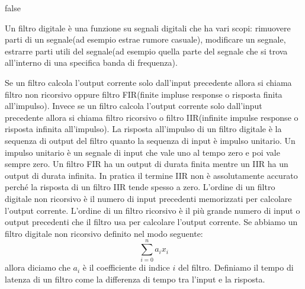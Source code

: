 
\if false

Un filtro digitale \`e una funzione su segnali digitali che ha vari scopi: rimuovere parti di un segnale(ad esempio estrae rumore casuale), modificare un segnale, estrarre parti utili del segnale(ad esempio quella parte del segnale che si trova all'interno di una specifica banda di frequenza). 


Se un filtro calcola l'output corrente solo dall'input precedente allora si chiama filtro non ricorsivo oppure filtro FIR(finite impluse response o risposta finita all'impulso). Invece se un filtro calcola l'output corrente solo dall'input precedente allora si chiama filtro ricorsivo o filtro IIR(infinite impulse response o risposta infinita all'impulso). 
La risposta all'impulso di un filtro digitale \`e la sequenza di output del filtro quanto la sequenza di input \`e impulso unitario. Un impulso unitario \`e un segnale di input che vale uno al tempo zero e poi vale sempre zero. 
Un filtro FIR ha un output di durata finita mentre un IIR ha un output di durata infinita. In pratica il termine IIR non \`e assolutamente accurato perch\'e la risposta di un filtro IIR tende spesso a zero. 
L'ordine di un filtro digitale non ricorsivo \`e il numero di input precedenti memorizzati per calcolare l'output corrente. L'ordine di un filtro ricorsivo \`e il pi\`u grande numero di input o output precedenti che il filtro usa per calcolare l'output corrente. 
Se abbiamo un filtro digitale non ricorsivo definito nel modo seguente: 
\[
  \sum_{i=0}^{n} a_{i} x_{i}
\] 
allora diciamo che $a_{i}$ \`e il coefficiente di indice $i$ del filtro. Definiamo il tempo di latenza di un filtro come la differenza di tempo tra l'input e la risposta.


